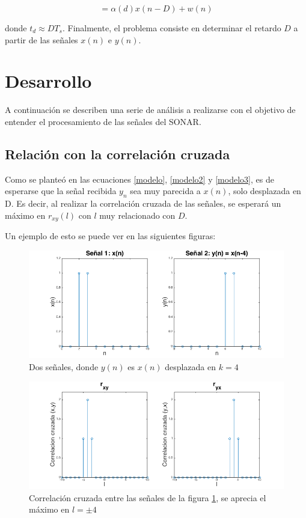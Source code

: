 \documentclass[letterpaper,11pt]{article}
\begin{document}
\begin{equation}
= \alpha(d)x(n-D) + w(n)
\label{modelo3}
\end{equation}

donde $t_{d} \approx DT_{s}$. Finalmente, el problema consiste en determinar el retardo $D$ a partir de las señales $x(n)$ e $y(n)$.

\section{Desarrollo}

A continuación se describen una serie de análisis a realizarse con el objetivo de entender el procesamiento de las señales del SONAR.

\subsection{Relación con la correlación cruzada}

Como se planteó en las ecuaciones \eqref{modelo}, \eqref{modelo2} y \eqref{modelo3}, es de esperarse que la señal recibida $y_{n}$ sea muy parecida a $x(n)$, solo desplazada en D. Es decir, al realizar la correlación cruzada de las señales, se esperará un máximo en $r_{xy}(l)$ con $l$ muy relacionado con $D$.\par

Un ejemplo de esto se puede ver en las siguientes figuras:


\begin{figure}[H]
\centering
\includegraphics[width=1.0\textwidth]{img/parte_a/senales.png}
\caption{Dos señales, donde $y(n)$ es $x(n)$ desplazada en $k = 4$}
\label{desplazamiento}
\end{figure}

\begin{figure}[H]
\centering
\includegraphics[width=1.0\textwidth]{img/parte_a/correlaciones.png}
\caption{Correlación cruzada entre las señales de la figura \ref{desplazamiento}, se aprecia el máximo en $l = \pm4$}
\label{correlacion}
\end{figure}
\end{document}
